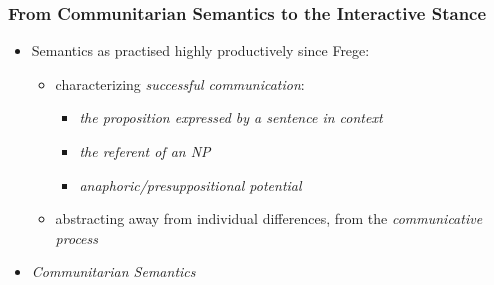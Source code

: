 \documentclass{beamer}
\newcommand{\bit}{\begin{itemize}}
\newcommand{\eit}{\end{itemize}}
\begin{document}
\begin{frame}
\frametitle{From Communitarian Semantics to the Interactive Stance}

\begin{itemize}

\item Semantics as practised highly productively since Frege:
\begin{itemize} \item characterizing {\it successful communication}:
\bit
\item {\it the proposition expressed by a sentence in context}
\item {\it the referent of an NP}
\item {\it anaphoric/presuppositional potential}
\eit
\item abstracting away from individual differences, from the
{\it communicative process}
\end{itemize}
\item {\it Communitarian Semantics}
\end{itemize}

\end{frame}
\end{document}
